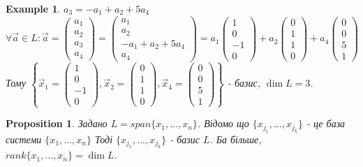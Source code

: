 \documentclass[a4paper, 10pt]{article}
\theoremstyle{theoremdd}
\newtheorem{example}[theorem]{Example}
\newtheorem{proposition}[theorem]{Proposition}
\begin{document}
\begin{example}
	$a_3 = -a_1 + a_2 + 5a_4$\\
	$\forall \vec{a} \in L: \vec{a} = \begin{pmatrix} a_1 \\ a_2 \\ a_3 \\ a_4 \end{pmatrix} = \begin{pmatrix} a_1 \\ a_2 \\ -a_1 + a_2 + 5a_4 \\ a_4 \end{pmatrix} = a_1 \begin{pmatrix} 1 \\ 0 \\ -1 \\ 0 \end{pmatrix} + a_2 \begin{pmatrix} 0 \\ 1 \\ 1 \\ 0 \end{pmatrix} + a_4 \begin{pmatrix} 0 \\ 0 \\ 5 \\ 1 \end{pmatrix}$\\
	Тому $\left\{\vec{x}_1 = \begin{pmatrix} 1 \\ 0 \\ -1 \\ 0\end{pmatrix}, \vec{x}_2 = \begin{pmatrix} 0 \\ 1 \\ 1 \\ 0\end{pmatrix}, \vec{x}_4 = \begin{pmatrix} 0 \\ 0 \\ 5 \\ 1\end{pmatrix} \right\}$ - базис, $\dim{L} = 3$.
	\end{example}
	
	\iffalse
	\begin{proposition}
	Задано $L = span\{x_1,\dots,x_n\}$. Відомо що $\{x_{j_1},\dots,x_{j_k}\}$ - це база системи $\{x_1,\dots,x_n\}$ Тоді $\{x_{j_1},\dots,x_{j_k}\}$ - базис $L$. Ба більше, $rank\{x_1,\dots,x_n\} = \dim L$.
	\end{proposition}
	
\end{document}
